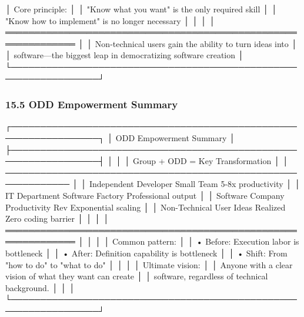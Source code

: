 \documentclass[
]{article}
\newenvironment{Shaded}{}{}
\newcommand{\NormalTok}[1]{#1}
\begin{document}
\begin{Shaded}
\begin{Highlighting}[]
\NormalTok{│  Core principle:                                                │}
\NormalTok{│  "Know what you want" is the only required skill                │}
\NormalTok{│  "Know how to implement" is no longer necessary                 │}
\NormalTok{│                                                                  │}
\NormalTok{│  ══════════════════════════════════════════════════════════════  │}
\NormalTok{│  Non{-}technical users gain the ability to turn ideas into       │}
\NormalTok{│  software—the biggest leap in democratizing software creation  │}
\NormalTok{└─────────────────────────────────────────────────────────────────┘}
\end{Highlighting}
\end{Shaded}

\hypertarget{155-odd-empowerment-summary}{%
\subsubsection{15.5 ODD Empowerment
Summary}\label{155-odd-empowerment-summary}}

\begin{Shaded}
\begin{Highlighting}[]
\NormalTok{┌─────────────────────────────────────────────────────────────────┐}
\NormalTok{│                   ODD Empowerment Summary                        │}
\NormalTok{├─────────────────────────────────────────────────────────────────┤}
\NormalTok{│                                                                  │}
\NormalTok{│  Group                    + ODD =           Key Transformation  │}
\NormalTok{│  ─────────────────────────────────────────────────────────────  │}
\NormalTok{│  Independent Developer    Small Team        5{-}8x productivity   │}
\NormalTok{│  IT Department           Software Factory   Professional output │}
\NormalTok{│  Software Company        Productivity Rev   Exponential scaling │}
\NormalTok{│  Non{-}Technical User      Ideas Realized     Zero coding barrier │}
\NormalTok{│                                                                  │}
\NormalTok{│  ══════════════════════════════════════════════════════════════  │}
\NormalTok{│                                                                  │}
\NormalTok{│  Common pattern:                                                │}
\NormalTok{│  • Before: Execution labor is bottleneck                        │}
\NormalTok{│  • After: Definition capability is bottleneck                   │}
\NormalTok{│  • Shift: From "how to do" to "what to do"                      │}
\NormalTok{│                                                                  │}
\NormalTok{│  Ultimate vision:                                               │}
\NormalTok{│  Anyone with a clear vision of what they want can create       │}
\NormalTok{│  software, regardless of technical background.                  │}
\NormalTok{│                                                                  │}
\NormalTok{└─────────────────────────────────────────────────────────────────┘}
\end{Highlighting}
\end{Shaded}
\end{document}
